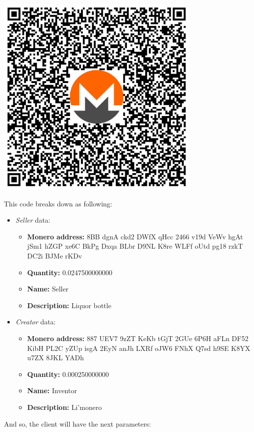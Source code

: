 \documentclass[12pt,a4paper]{article}
\begin{document}
\begin{center}
\includegraphics[width=0.75\textwidth]{media/qr-code2-en.pdf}
\end{center}

This code breaks down as following:

\begin{itemize}
\item \textit{Seller} data:
	\begin{itemize}
	\item \textbf{Monero address:} 8BB dgnA ckd2 DWfX qHcc 2466 v19d VeWv hgAt jSm1 hZGP xe6C BkPg Dxqa BLbr D9NL K8re WLFf oUtd pg18 rzkT DC2i BJMe rKDv
	\item \textbf{Quantity:} 0.0247500000000
	\item \textbf{Name:} Seller
	\item \textbf{Description:} Liquor bottle
	\end{itemize}
\item \textit{Creator} data:
	\begin{itemize}
	\item \textbf{Monero address:} 887 UEV7 9zZT KeKb tGjT 2GUe 6P6H aFLn DF52 KibH PL2C yZUp isgA 2EyN anJh LXRf oJW6 FNhX Q7sd h9SE K8YX u7ZX 8JKL YADh
	\item \textbf{Quantity:} 0.000250000000
	\item \textbf{Name:} Inventor
	\item \textbf{Description:} Li'monero
	\end{itemize}
\end{itemize}

And so, the client will have the next parameters:
\end{document}
